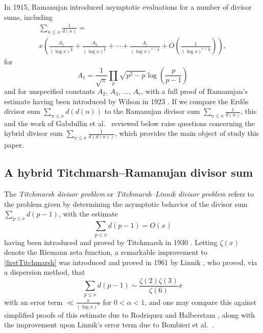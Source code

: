 \documentclass[12pt]{article}
\begin{document}
 In 1915, Ramanujan \cite{Ramanujan1915analytic} introduced asymptotic evaluations for a number of divisor sums, including 
\begin{multline}\label{displayRamanujan}
 \sum_{n \leq x} \frac{1}{d(n)} = \\ 
 x \left( \frac{A_1}{ (\log x)^{\frac{1}{2}} } 
 + \frac{A_2}{ (\log x)^{\frac{3}{2}} } 
 + \cdots + \frac{A_r}{(\log x)^{r - \frac{1}{2}}} + O\left( \frac{1}{(\log x)^{r + \frac{1}{2}}} \right) \right), 
\end{multline}
 for $$ A_{1} = \frac{1}{\sqrt{\pi}} \prod_p \sqrt{p^2 - p} \log\left( \frac{p}{p-1} \right) $$ and for unspecified constants $A_{2}$, $A_{3}$, 
 $\ldots$, $A_{r}$, with a full proof of Ramanujan's estimate having been introduced by Wilson in 1923 \cite{Wilson1923}. If we compare 
 the Erd\H os divisor sum $ \sum_{n \leq x} d(d(n))$ to the Ramanujan divisor sum $ \sum_{n \leq x} \frac{1}{d(n)}$, this 
 and the work of Gabdullin et al.\ \cite{GabdullinKonyaginIudelevich2023} reviewed below 
 raise questions concerning the 
 hybrid divisor sum $\sum_{n \leq x} \frac{1}{d(d(n))}$, which provides the main object of study this paper. 

\subsection{A hybrid Titchmarsh--Ramanujan divisor sum}
 The \emph{Titchmarsh divisor problem} or \emph{Titchmarsh--Linnik divisor problem} \cite{Halberstam1967} refers to the problem given 
 by determining the asymptotic behavior of the divisor sum $\sum_{p \leq x} d(p-1)$, with the estimate 
\begin{equation}\label{firstTitchmarsh}
 \sum_{p \leq x} d(p-1) = O(x) 
\end{equation}
 having been introduced and proved by Titchmarsh in 1930 \cite{Titchmarsh1930}. Letting $\zeta(x)$ denote the Riemann zeta function, 
 a remarkable improvement to \eqref{firstTitchmarsh} was introduced and proved in 1961 by Linnik \cite{Linnik1961}, who proved, via a 
 dispersion method, that 
\begin{equation}\label{displayLinnik}
 \sum_{p \leq x} d(p-1) \sim \frac{ \zeta(2) \zeta(3) }{ \zeta(6) } x 
\end{equation}
 with an error term $\ll \frac{x}{ (\log x)^{\alpha} }$ for $0 < \alpha < 1$, and one may compare this against simplified proofs of this 
 estimate due to Rodriquez \cite{Rodriquez1965} and Halberstam \cite{Halberstam1967}, along with the improvement upon Linnik's 
 error term due to Bombieri et al.~\cite{BombieriFriedlanderIwaniec1986}. 
\end{document}
